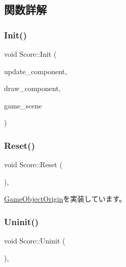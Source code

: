 \subsection{関数詳解}
\mbox{\label{class_score_a7ea7580fa6ed65e683d682c637aeee25}} 
\subsubsection{\texorpdfstring{Init()}{Init()}}
{\footnotesize\ttfamily void Score\+::\+Init (\begin{DoxyParamCaption}\item[{\mbox{\hyperlink{class_update_component}{Update\+Component}} $\ast$}]{update\+\_\+component,  }\item[{\mbox{\hyperlink{class_draw_component}{Draw\+Component}} $\ast$}]{draw\+\_\+component,  }\item[{\mbox{\hyperlink{class_game_scene}{Game\+Scene}} $\ast$}]{game\+\_\+scene }\end{DoxyParamCaption})}

\mbox{\label{class_score_ad01d461a2b6ca345858b2ae0a3d81cc1}} 
\subsubsection{\texorpdfstring{Reset()}{Reset()}}
{\footnotesize\ttfamily void Score\+::\+Reset (\begin{DoxyParamCaption}{ }\end{DoxyParamCaption})\hspace{0.3cm}{\ttfamily [override]}, {\ttfamily [virtual]}}



\mbox{\hyperlink{class_game_object_origin_af9af378a4fd9028316a6fdb461ed6a10}{Game\+Object\+Origin}}を実装しています。

\mbox{\label{class_score_a605e163dc59ccc4d19a3cb6b5db813b8}} 
\subsubsection{\texorpdfstring{Uninit()}{Uninit()}}
{\footnotesize\ttfamily void Score\+::\+Uninit (\begin{DoxyParamCaption}{ }\end{DoxyParamCaption})\hspace{0.3cm}{\ttfamily [override]}, {\ttfamily [virtual]}}




